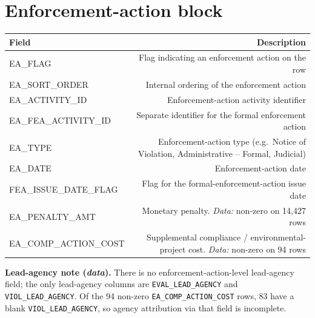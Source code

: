 \documentclass[11pt]{article}
\begin{document}
\section*{Enforcement-action block}
\begin{longtable}{F D}
\toprule
Field & Description \\ \midrule \endhead
EA\_FLAG & Flag indicating an enforcement action on the row \\
EA\_SORT\_ORDER & Internal ordering of the enforcement action \\
EA\_ACTIVITY\_ID & Enforcement-action activity identifier \\
EA\_FEA\_ACTIVITY\_ID & Separate identifier for the formal enforcement action \\
EA\_TYPE & Enforcement-action type (e.g.\ Notice of Violation, Administrative -- Formal, Judicial) \\
EA\_DATE & Enforcement-action date \\
FEA\_ISSUE\_DATE\_FLAG & Flag for the formal-enforcement-action issue date \\
EA\_PENALTY\_AMT & Monetary penalty. \emph{Data:} non-zero on 14{,}427 rows \\
EA\_COMP\_ACTION\_COST & Supplemental compliance / environmental-project cost. \emph{Data:} non-zero on
94 rows \\
\bottomrule
\end{longtable}

\noindent\textbf{Lead-agency note (\emph{data}).} There is no enforcement-action-level lead-agency
field; the only lead-agency columns are \texttt{EVAL\_LEAD\_AGENCY} and \texttt{VIOL\_LEAD\_AGENCY}.
Of the 94 non-zero \texttt{EA\_COMP\_ACTION\_COST} rows, 83 have a blank \texttt{VIOL\_LEAD\_AGENCY},
so agency attribution via that field is incomplete.
\end{document}
